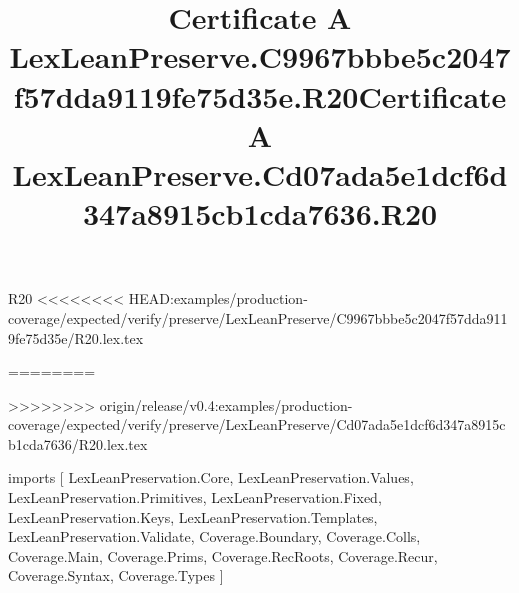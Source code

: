 \begin{lexlean}{R20}
<<<<<<<< HEAD:examples/production-coverage/expected/verify/preserve/LexLeanPreserve/C9967bbbe5c2047f57dda9119fe75d35e/R20.lex.tex
\title{Certificate A LexLeanPreserve.C9967bbbe5c2047f57dda9119fe75d35e.R20}
========
\title{Certificate A LexLeanPreserve.Cd07ada5e1dcf6d347a8915cb1cda7636.R20}
>>>>>>>> origin/release/v0.4:examples/production-coverage/expected/verify/preserve/LexLeanPreserve/Cd07ada5e1dcf6d347a8915cb1cda7636/R20.lex.tex
\begin{coremodule}
imports [
  LexLeanPreservation.Core,
  LexLeanPreservation.Values,
  LexLeanPreservation.Primitives,
  LexLeanPreservation.Fixed,
  LexLeanPreservation.Keys,
  LexLeanPreservation.Templates,
  LexLeanPreservation.Validate,
  Coverage.Boundary,
  Coverage.Colls,
  Coverage.Main,
  Coverage.Prims,
  Coverage.RecRoots,
  Coverage.Recur,
  Coverage.Syntax,
  Coverage.Types
]


\end{coremodule}
\end{lexlean}
